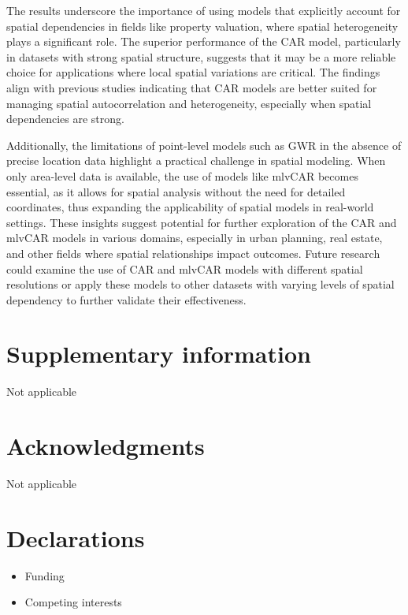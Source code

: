 \documentclass[
  default,
]{sn-jnl}
\providecommand{\tightlist}{%
  \setlength{\itemsep}{0pt}\setlength{\parskip}{0pt}}\usepackage{longtable,booktabs,array}
\begin{document}
The results underscore the importance of using models that explicitly
account for spatial dependencies in fields like property valuation,
where spatial heterogeneity plays a significant role. The superior
performance of the CAR model, particularly in datasets with strong
spatial structure, suggests that it may be a more reliable choice for
applications where local spatial variations are critical. The findings
align with previous studies indicating that CAR models are better suited
for managing spatial autocorrelation and heterogeneity, especially when
spatial dependencies are strong.

Additionally, the limitations of point-level models such as GWR in the
absence of precise location data highlight a practical challenge in
spatial modeling. When only area-level data is available, the use of
models like mlvCAR becomes essential, as it allows for spatial analysis
without the need for detailed coordinates, thus expanding the
applicability of spatial models in real-world settings. These insights
suggest potential for further exploration of the CAR and mlvCAR models
in various domains, especially in urban planning, real estate, and other
fields where spatial relationships impact outcomes. Future research
could examine the use of CAR and mlvCAR models with different spatial
resolutions or apply these models to other datasets with varying levels
of spatial dependency to further validate their effectiveness.

\section*{Supplementary information}\label{supplementary-information}

Not applicable

\section*{Acknowledgments}\label{acknowledgments}

Not applicable

\section*{Declarations}\label{declarations}

\begin{itemize}
\tightlist
\item
  Funding
\item
  Competing interests
\end{itemize}
\end{document}
